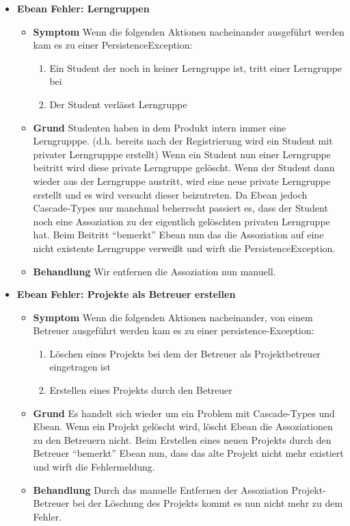 \documentclass[parskip=full]{scrartcl}
\newcommand{\fehler}[4]{\textbf{#1}
 							\begin{itemize}
 							  \item \textbf{Symptom}  #2
 							  \item \textbf{Grund} #3
 							  \item \textbf{Behandlung} #4
 							\end{itemize}}
\newcommand{\code}[1]{{\ttfamily #1}}
\begin{document}
\begin{itemize}
\item \fehler{Ebean Fehler: Lerngruppen}{Wenn die folgenden Aktionen
nacheinander ausgeführt werden kam es zu einer
\code{PersistenceException}:\begin{enumerate}
  \item Ein Student der noch in keiner Lerngruppe ist, tritt einer Lerngruppe
  bei
  \item Der Student verlässt Lerngruppe
\end{enumerate}}
{Studenten haben in dem Produkt intern immer eine Lerngrupppe.
(d.h.
bereits nach der Registrierung wird ein Student mit privater Lerngrupppe
erstellt) Wenn ein Student nun einer Lerngruppe beitritt wird diese private
Lerngruppe gelöscht. Wenn der Student dann wieder aus der Lerngruppe austritt,
wird eine neue private Lerngruppe erstellt und es wird versucht dieser beizutreten. Da Ebean
jedoch Cascade-Types nur manchmal beherrscht passiert es, dass der Student noch
eine Assoziation zu der eigentlich gelöschten privaten Lerngruppe hat. Beim
Beitritt \enquote{bemerkt} Ebean nun das die Assoziation auf eine nicht
existente Lerngruppe verweißt und wirft die \code{PersistenceException}.}{Wir
entfernen die Assoziation nun manuell.}
\item \fehler{Ebean Fehler: Projekte als Betreuer erstellen}{Wenn die folgenden
Aktionen nacheinander, von einem Betreuer ausgeführt werden kam es zu einer
persistence-Exception:
\begin{enumerate}
  \item Löschen eines Projekts bei dem der Betreuer als Projektbetreuer
  eingetragen ist
  \item Erstellen eines Projekts durch den Betreuer
\end{enumerate}}{Es handelt sich wieder um ein Problem mit Cascade-Types und
Ebean. Wenn ein Projekt gelöscht wird, löscht Ebean die Assoziationen zu den
Betreuern nicht. Beim Erstellen eines neuen Projekts durch den Betreuer
\enquote{bemerkt} Ebean nun, dass das alte Projekt nicht mehr existiert und
wirft die Fehlermeldung. 
}{Durch das manuelle Entfernen der Assoziation Projekt-Betreuer
bei der Löschung des Projekts kommt es nun nicht mehr zu dem Fehler. }
\end{itemize}
\end{document}
